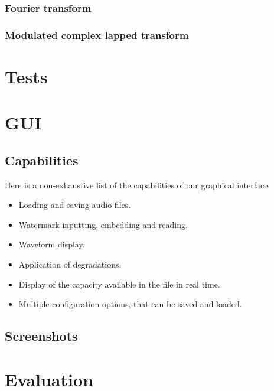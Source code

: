 \subsubsection{Fourier transform}
\subsubsection{Modulated complex lapped transform}
\section{Tests}
\section{GUI}
\subsection{Capabilities}
Here is a non-exhaustive list of the capabilities of our graphical interface.
\begin{itemize}
\item Loading and saving audio files.
\item Watermark inputting, embedding and reading.
\item Waveform display.
\item Application of degradations.
\item Display of the capacity available in the file in real time.
\item Multiple configuration options, that can be saved and loaded.
\end{itemize}
\subsection{Screenshots}
\section{Evaluation}